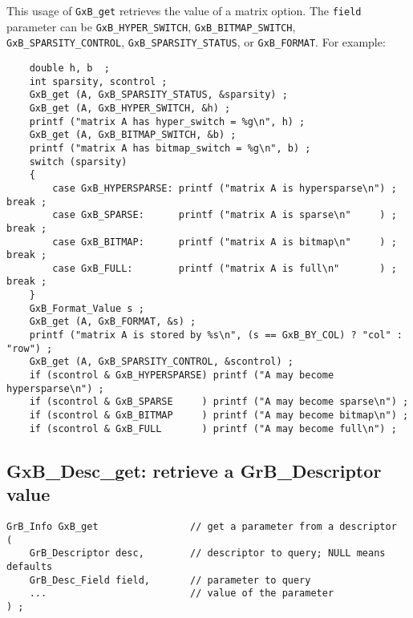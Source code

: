 \documentclass[12pt]{article}
\begin{document}
This usage of \verb'GxB_get' retrieves the value of a matrix option.  The
\verb'field' parameter can be
\verb'GxB_HYPER_SWITCH',
\verb'GxB_BITMAP_SWITCH',
\verb'GxB_SPARSITY_CONTROL',
\verb'GxB_SPARSITY_STATUS',
or
\verb'GxB_FORMAT'.
For example:

\vspace{-0.1in}
{\footnotesize
\begin{verbatim}
    double h, b  ;
    int sparsity, scontrol ;
    GxB_get (A, GxB_SPARSITY_STATUS, &sparsity) ;
    GxB_get (A, GxB_HYPER_SWITCH, &h) ;
    printf ("matrix A has hyper_switch = %g\n", h) ;
    GxB_get (A, GxB_BITMAP_SWITCH, &b) ;
    printf ("matrix A has bitmap_switch = %g\n", b) ;
    switch (sparsity)
    {
        case GxB_HYPERSPARSE: printf ("matrix A is hypersparse\n") ; break ;
        case GxB_SPARSE:      printf ("matrix A is sparse\n"     ) ; break ;
        case GxB_BITMAP:      printf ("matrix A is bitmap\n"     ) ; break ;
        case GxB_FULL:        printf ("matrix A is full\n"       ) ; break ;
    }
    GxB_Format_Value s ;
    GxB_get (A, GxB_FORMAT, &s) ;
    printf ("matrix A is stored by %s\n", (s == GxB_BY_COL) ? "col" : "row") ;
    GxB_get (A, GxB_SPARSITY_CONTROL, &scontrol) ;
    if (scontrol & GxB_HYPERSPARSE) printf ("A may become hypersparse\n") ;
    if (scontrol & GxB_SPARSE     ) printf ("A may become sparse\n") ;
    if (scontrol & GxB_BITMAP     ) printf ("A may become bitmap\n") ;
    if (scontrol & GxB_FULL       ) printf ("A may become full\n") ; \end{verbatim} }

\subsection{{\sf GxB\_Desc\_get:} retrieve a {\sf GrB\_Descriptor} value}

\begin{mdframed}[userdefinedwidth=6in]
{\footnotesize
\begin{verbatim}
GrB_Info GxB_get                // get a parameter from a descriptor
(
    GrB_Descriptor desc,        // descriptor to query; NULL means defaults
    GrB_Desc_Field field,       // parameter to query
    ...                         // value of the parameter
) ;
\end{verbatim} } \end{mdframed}
\end{document}
